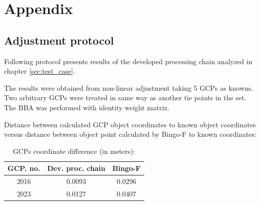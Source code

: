\documentclass[a4paper,12pt]{article}
\begin{document}









\section{Appendix}
\subsection{Adjustment protocol}
\label{sec:adj_protocol}

Following protocol presents results of the developed processing chain
analyzed in chapter \ref{sec:test_case}.

The results were  obtained from non-linear adjustment taking 5 GCPs as knowns.
Two arbitrary GCPs were treated in same way as another tie points 
in the set. The BBA was performed with identity weight matrix. 

Distance between calculated GCP object coordinates  to
 known object coordinates versus distance between object point calculated by  Bingo-F 
 to known coordinates:
\begin{center}
\footnotesize
{}
\begin{longtable}{| c || c | c |}
\caption{GCPs coordinate difference (in meters):}
\\ \hline
\label{table:comparison}
GCP. no. & Dev. proc. chain &  Bingo-F \\ \hline 
  2016  &    0.0093  &  0.0296 \\ \hline 
  2023 &     0.0127  &   0.0407 \\ \hline 
  \hline 
\end{longtable}
\end{center}
\end{document}
